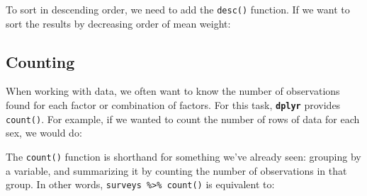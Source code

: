 \documentclass[]{book}
\newenvironment{Shaded}{\begin{snugshade}}{\end{snugshade}}
\newcommand{\KeywordTok}[1]{\textcolor[rgb]{0.13,0.29,0.53}{\textbf{#1}}}
\newcommand{\DataTypeTok}[1]{\textcolor[rgb]{0.13,0.29,0.53}{#1}}
\newcommand{\StringTok}[1]{\textcolor[rgb]{0.31,0.60,0.02}{#1}}
\newcommand{\OperatorTok}[1]{\textcolor[rgb]{0.81,0.36,0.00}{\textbf{#1}}}
\newcommand{\NormalTok}[1]{#1}
\begin{document}
To sort in descending order, we need to add the \texttt{desc()}
function. If we want to sort the results by decreasing order of mean
weight:

\begin{Shaded}
\end{Shaded}

\subsection{Counting}\label{counting}

When working with data, we often want to know the number of observations
found for each factor or combination of factors. For this task,
\textbf{\texttt{dplyr}} provides \texttt{count()}. For example, if we
wanted to count the number of rows of data for each sex, we would do:

\begin{Shaded}
\end{Shaded}

The \texttt{count()} function is shorthand for something we've already
seen: grouping by a variable, and summarizing it by counting the number
of observations in that group. In other words,
\texttt{surveys\ \%\textgreater{}\%\ count()} is equivalent to:

\begin{Shaded}
\end{Shaded}
\end{document}
